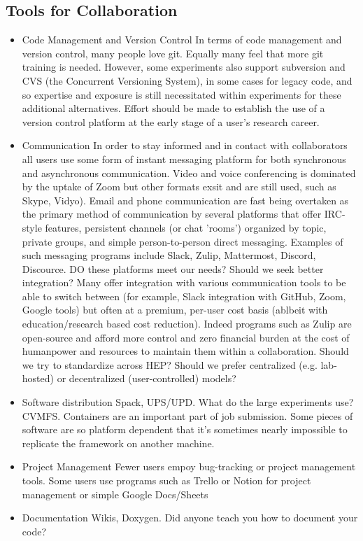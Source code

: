\subsection{Tools for Collaboration}

\begin{itemize} 
  \item Code Management and Version Control
In terms of code management and version control, many people love git. Equally many feel that more git training is needed. However, some experiments also support subversion and CVS (the Concurrent Versioning System), in some cases for legacy code, and so expertise and exposure is still necessitated
within experiments for these additional alternatives. Effort should be made to establish the use of a version control platform at the early stage of a user's research career. 
  \item Communication
In order to stay informed and in contact with collaborators all users use some form of instant messaging platform for both synchronous and asynchronous communication. Video and voice conferencing is dominated by the uptake of Zoom but other formats exsit and are still used, such as Skype, Vidyo). Email and phone communication are fast being overtaken as the primary method of communication by several platforms that offer IRC-style 
features, persistent channels (or chat 'rooms') organized by topic, private groups, and simple person-to-person direct messaging. Examples of such messaging programs include Slack, Zulip, Mattermost, Discord, Discource. 
DO these platforms meet our needs? Should we seek better integration? Many offer integration with various communication tools to be able to switch between (for example, Slack integration with GitHub, Zoom, Google tools) but often at a premium, per-user cost basis (ablbeit with education/research based cost reduction). Indeed programs such as Zulip are open-source and afford 
more control and zero financial burden at the cost of humanpower and resources to maintain them within a collaboration.
Should we try to standardize across HEP?
Should we prefer centralized (e.g. lab-hosted) or decentralized (user-controlled) models?
  \item Software distribution
Spack, UPS/UPD. What do the large experiments use?
CVMFS.
Containers are an important part of job submission.
Some pieces of software are so platform dependent that it's sometimes nearly impossible to replicate the framework on another machine.

  \item Project Management
Fewer users empoy bug-tracking or project management tools. 
Some users use programs such as Trello or Notion for project management or simple Google Docs/Sheets
  \item Documentation
Wikis, Doxygen. Did anyone teach you how to document your code?


\end{itemize}

